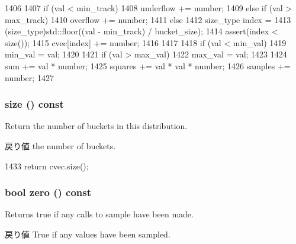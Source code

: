 \begin{DoxyCode}
1406     {
1407         if (val < min_track)
1408             underflow += number;
1409         else if (val > max_track)
1410             overflow += number;
1411         else {
1412             size_type index =
1413                 (size_type)std::floor((val - min_track) / bucket_size);
1414             assert(index < size());
1415             cvec[index] += number;
1416         }
1417 
1418         if (val < min_val)
1419             min_val = val;
1420 
1421         if (val > max_val)
1422             max_val = val;
1423 
1424         sum += val * number;
1425         squares += val * val * number;
1426         samples += number;
1427     }
\end{DoxyCode}
\hypertarget{classStats_1_1DistStor_a503ab01f6c0142145d3434f6924714e7}{
\subsubsection[{size}]{ size () const}}
\label{classStats_1_1DistStor_a503ab01f6c0142145d3434f6924714e7}
Return the number of buckets in this distribution. \begin{DoxyReturn}{戻り値}
the number of buckets. 
\end{DoxyReturn}



\begin{DoxyCode}
1433 { return cvec.size(); }
\end{DoxyCode}
\hypertarget{classStats_1_1DistStor_a4e72b01b727d3165e75cba84eb507491}{
\subsubsection[{zero}]{\setlength{\rightskip}{0pt plus 5cm}bool zero () const}}
\label{classStats_1_1DistStor_a4e72b01b727d3165e75cba84eb507491}
Returns true if any calls to sample have been made. \begin{DoxyReturn}{戻り値}
True if any values have been sampled. 
\end{DoxyReturn}




